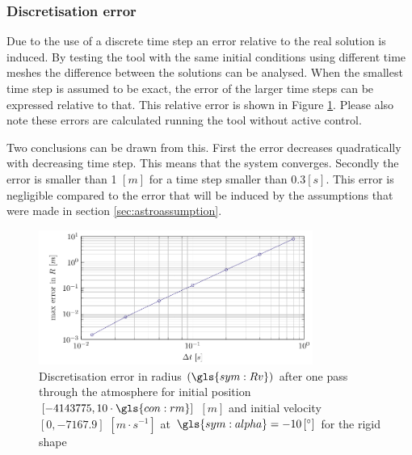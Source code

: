 \subsubsection{Discretisation error}
\label{sec:astrodisc}

Due to the use of a discrete time step an error relative to the real solution is induced. By testing the tool with the same initial conditions using different time meshes the difference between the solutions can be analysed. When the smallest time step is assumed to be exact, the error of the larger time steps can be expressed relative to that. This relative error is shown in Figure \ref{fig:atmos_disc}. Please also note these errors are calculated running the tool without active control.

Two conclusions can be drawn from this. First the error decreases quadratically with decreasing time step. This means that the system converges. Secondly the error is smaller than 1 $\left[m\right]$ for a time step smaller than $0.3 \left[s\right]$. This error is negligible compared to the error that will be induced by the assumptions that were made in section \ref{sec:astroassumption}.



\begin{figure}[ht]
	\centering
	\includegraphics[width=0.8\textwidth]{Figure/orbit/dicretization.pdf}
	\caption[Discretisation error in location $\left(\gls{sym:Rv}\right)$ after one pass through the atmosphere for the rigid shape]{Discretisation error in radius $\left(\gls{sym:Rv}\right)$ after one pass through the atmosphere for initial position $\left[-4143775,10\cdot\gls{con:rm}\right]$ $\left[m\right]$ and initial velocity $\left[0,-7167.9\right]$ $\left[m\cdot s^{-1} \right]$ at $\gls{sym:alpha}=-10\left[^\circ\right]$ for the rigid shape}
	\label{fig:atmos_disc}
\end{figure}

